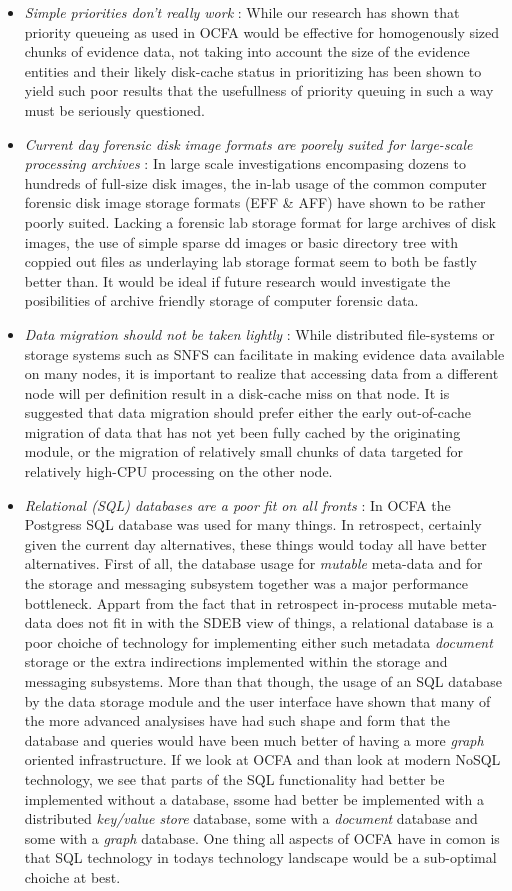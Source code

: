 \begin{itemize}
\item \emph{Simple priorities don't really work} : While our research has shown that priority queueing as used in OCFA would be effective for homogenously sized chunks of evidence data, not taking into account the size of the evidence entities and their likely disk-cache status in prioritizing has been shown to yield such poor results that the usefullness of priority queuing in such a way must be seriously questioned. 
\item \emph{Current day forensic disk image formats are poorely suited for large-scale processing archives} : In large scale investigations encompasing dozens to hundreds of full-size disk images, the in-lab usage of the common computer forensic disk image storage formats (EFF \& AFF) have shown to be rather poorly suited. Lacking a forensic lab storage format for large archives of disk images, the use of simple sparse dd images or basic directory tree with coppied out files as underlaying lab storage format seem to both be fastly better than. It would be ideal if future research would investigate the posibilities of archive friendly storage of computer forensic data.
\item \emph{Data migration should not be taken lightly} : While distributed file-systems or storage systems such as SNFS can facilitate in making evidence data available on many nodes, it is important to realize that accessing data from a different node will per definition result in a disk-cache miss on that node. It is suggested that data migration should prefer either the early out-of-cache migration of data that has not yet been fully cached by the originating module, or the migration of relatively small chunks of data targeted for relatively high-CPU processing on the other node. 
\item \emph{Relational (SQL) databases are a poor fit on all fronts} : In OCFA the Postgress SQL database was used for many things. In retrospect, certainly given the current day alternatives, these things would today all have better alternatives. First of all, the database usage for \emph{mutable} meta-data and for the storage and messaging subsystem together was a major performance bottleneck. Appart from the fact that in retrospect in-process mutable meta-data does not fit in with the SDEB view of things, a relational database is a poor choiche of technology for implementing either such metadata \emph{document} storage or the extra indirections implemented within the storage and messaging subsystems. More than that though, the usage of an SQL database by the data storage module and the user interface have shown that many of the more advanced analysises have had such shape and form that the database and queries would have been much better of having a more \emph{graph} oriented infrastructure. If we look at OCFA and than look at modern NoSQL technology, we see that parts of the SQL functionality had better be implemented without a database, ssome had better be implemented with a distributed \emph{key/value store} database, some with a \emph{document} database and some with a \emph{graph} database.  One thing all aspects of OCFA have in comon is that SQL technology in todays technology landscape would be a sub-optimal choiche at best. 

\end{itemize}
